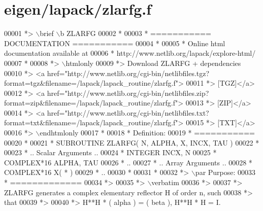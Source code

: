 \hypertarget{eigen_2lapack_2zlarfg_8f_source}{}\section{eigen/lapack/zlarfg.f}
\label{eigen_2lapack_2zlarfg_8f_source}

\begin{DoxyCode}
00001 \textcolor{comment}{*> \(\backslash\)brief \(\backslash\)b ZLARFG}
00002 \textcolor{comment}{*}
00003 \textcolor{comment}{*  =========== DOCUMENTATION ===========}
00004 \textcolor{comment}{*}
00005 \textcolor{comment}{* Online html documentation available at }
00006 \textcolor{comment}{*            http://www.netlib.org/lapack/explore-html/ }
00007 \textcolor{comment}{*}
00008 \textcolor{comment}{*> \(\backslash\)htmlonly}
00009 \textcolor{comment}{*> Download ZLARFG + dependencies }
00010 \textcolor{comment}{*> <a
       href="http://www.netlib.org/cgi-bin/netlibfiles.tgz?format=tgz&filename=/lapack/lapack\_routine/zlarfg.f"> }
00011 \textcolor{comment}{*> [TGZ]</a> }
00012 \textcolor{comment}{*> <a
       href="http://www.netlib.org/cgi-bin/netlibfiles.zip?format=zip&filename=/lapack/lapack\_routine/zlarfg.f"> }
00013 \textcolor{comment}{*> [ZIP]</a> }
00014 \textcolor{comment}{*> <a
       href="http://www.netlib.org/cgi-bin/netlibfiles.txt?format=txt&filename=/lapack/lapack\_routine/zlarfg.f"> }
00015 \textcolor{comment}{*> [TXT]</a>}
00016 \textcolor{comment}{*> \(\backslash\)endhtmlonly }
00017 \textcolor{comment}{*}
00018 \textcolor{comment}{*  Definition:}
00019 \textcolor{comment}{*  ===========}
00020 \textcolor{comment}{*}
00021 \textcolor{comment}{*       SUBROUTINE ZLARFG( N, ALPHA, X, INCX, TAU )}
00022 \textcolor{comment}{* }
00023 \textcolor{comment}{*       .. Scalar Arguments ..}
00024 \textcolor{comment}{*       INTEGER            INCX, N}
00025 \textcolor{comment}{*       COMPLEX*16         ALPHA, TAU}
00026 \textcolor{comment}{*       ..}
00027 \textcolor{comment}{*       .. Array Arguments ..}
00028 \textcolor{comment}{*       COMPLEX*16         X( * )}
00029 \textcolor{comment}{*       ..}
00030 \textcolor{comment}{*  }
00031 \textcolor{comment}{*}
00032 \textcolor{comment}{*> \(\backslash\)par Purpose:}
00033 \textcolor{comment}{*  =============}
00034 \textcolor{comment}{*>}
00035 \textcolor{comment}{*> \(\backslash\)verbatim}
00036 \textcolor{comment}{*>}
00037 \textcolor{comment}{*> ZLARFG generates a complex elementary reflector H of order n, such}
00038 \textcolor{comment}{*> that}
00039 \textcolor{comment}{*>}
00040 \textcolor{comment}{*>       H**H * ( alpha ) = ( beta ),   H**H * H = I.}

\end{DoxyCode}
